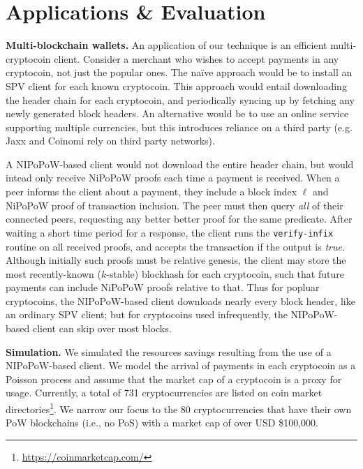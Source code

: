 \section{Applications \& Evaluation}
\label{sec.applications}

\noindent
\textbf{Multi-blockchain wallets.}
\label{sec.multichain}
An application of our technique is an efficient multi-cryptocoin client.
Consider a merchant who wishes to accept payments in any cryptocoin, not just
the popular ones. The na\"ive approach would be to install an SPV client for each known cryptocoin.
This approach would entail downloading the header chain for each cryptocoin, and
periodically syncing up by fetching any newly generated block headers. An
alternative would be to use an online service supporting multiple currencies,
but this introduces reliance on a third party (e.g. Jaxx and Coinomi rely on
third party networks).

A NIPoPoW-based client would not download the entire header chain, but would intead only receive NiPoPoW proofs each time a payment is received. When a peer informs the client about a payment, they include a block index $\ell$ and NiPoPoW proof of transaction inclusion. The peer must then query \emph{all} of their connected peers, requesting any better better proof for the same predicate. After waiting a short time period for a response, the client runs the \texttt{verify-infix} routine on all received proofs, and accepts the transaction if the output is \emph{true}. Although initially such proofs must be relative genesis, the client may store the most recently-known ($k$-stable) blockhash for each cryptocoin, such that future payments can include NiPoPoW proofs relative to that. Thus for popluar cryptocoins, the NIPoPoW-based
client downloads nearly every block header, like an ordinary SPV client; but for
cryptocoins used infrequently, the NIPoPoW-based client can skip over most
blocks.

\noindent
\textbf{Simulation.}
We simulated the resources savings resulting from the use of a NIPoPoW-based
client. We model the arrival of payments in each cryptocoin as a Poisson process
and assume that the market cap of a cryptocoin is a proxy for usage. Currently,
a total of 731 cryptocurrencies are listed on coin market
directories\footnote{\url{https://coinmarketcap.com/}}. We narrow our focus to
the 80 cryptocurrencies that have their own PoW blockchains (i.e., no PoS) with
a market cap of over USD \$100,000.

